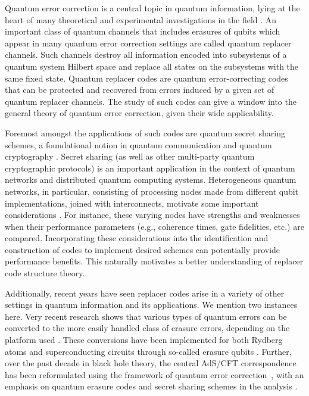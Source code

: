 \documentclass[11pt]{amsart}
\theoremstyle{definition}
\theoremstyle{definition}
\theoremstyle{definition}
\newcommand{\1}{\mathbb{I}}
\begin{document}
Quantum error correction is a central topic in quantum information, lying at the heart of many theoretical and experimental investigations in the field \cite{lidar2013quantum}.
An important class of quantum channels that includes erasures of qubits which appear in many quantum error correction settings are called quantum  replacer channels.
Such channels destroy all information encoded into subsystems of a quantum system Hilbert space and replace all states on the subsystems with the same fixed state.
Quantum replacer codes are quantum error-correcting codes that can be protected and recovered from errors induced by a given set of quantum replacer channels.
The study of such codes can give a window into the general theory of quantum error correction, given their wide applicability. 

Foremost amongst the applications of such codes are quantum secret sharing schemes, a foundational notion in quantum communication and quantum cryptography \cite{cleve1999share}.
Secret sharing (as well as other multi-party quantum cryptographic protocols) is an important application in the context of quantum networks and distributed quantum computing systems.
Heterogeneous quantum networks, in particular, consisting of processing nodes made from different qubit implementations, joined with interconnects, motivate some important considerations \cite{deLeonetal}.
For instance, these varying nodes have strengths and weaknesses when their performance parameters (e.g., coherence times, gate fidelities, etc.) are compared.
Incorporating these considerations into the identification and construction of codes to implement desired schemes can potentially provide performance benefits.
This naturally motivates a better understanding of replacer code structure theory. 

Additionally, recent years have seen replacer codes arise in a variety of other settings in quantum information and its applications.
We mention two instances here. 
Very recent research shows that various types of quantum errors can be converted to the more easily handled class of erasure errors, depending on the platform used \cite{WKST22,Ketal23,KCB23}.
These conversions have been implemented for both Rydberg atoms \cite{Scholl23,Ma2023} and superconducting circuits through so-called erasure qubits \cite{GVRK24,Letal24}.
Further, over the past decade in black hole theory, the central AdS/CFT correspondence has been reformulated using the framework of quantum error correction~\cite{AXH15,Harlow2017,Hayden2019,akers2019,Akers2022}, with an emphasis on quantum erasure codes and secret sharing schemes in the analysis \cite{AXH15}. 
\end{document}
